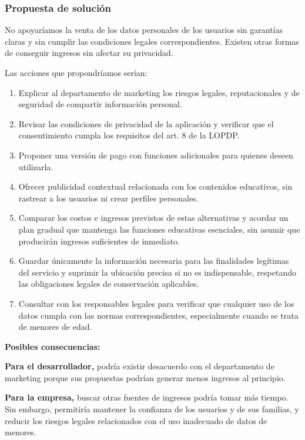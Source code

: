 \documentclass[12pt,a4paper,oneside]{article}
\newcommand{\rotulo}[1]{\par\Needspace{5\baselineskip}\noindent\textbf{#1}\par\nobreak}
\begin{document}
\subsubsection{Propuesta de solución}

No apoyaríamos la venta de los datos personales de los usuarios sin garantías claras y sin cumplir las condiciones legales correspondientes. Existen otras formas de conseguir ingresos sin afectar su privacidad.

Las acciones que propondríamos serían:

\begin{enumerate}[leftmargin=1.8em,itemsep=3pt]
    \item Explicar al departamento de marketing los riesgos legales, reputacionales y de seguridad de compartir información personal.
    \item Revisar las condiciones de privacidad de la aplicación y verificar que el consentimiento cumpla los requisitos del art. 8 de la LOPDP.
    \item Proponer una versión de pago con funciones adicionales para quienes deseen utilizarla.
    \item Ofrecer publicidad contextual relacionada con los contenidos educativos, sin rastrear a los usuarios ni crear perfiles personales.
    \item Comparar los costos e ingresos previstos de estas alternativas y acordar un plan gradual que mantenga las funciones educativas esenciales, sin asumir que producirán ingresos suficientes de inmediato.
    \item Guardar únicamente la información necesaria para las finalidades legítimas del servicio y suprimir la ubicación precisa si no es indispensable, respetando las obligaciones legales de conservación aplicables.
    \item Consultar con los responsables legales para verificar que cualquier uso de los datos cumpla con las normas correspondientes, especialmente cuando se trata de menores de edad.
\end{enumerate}

\rotulo{Posibles consecuencias:}

\textbf{Para el desarrollador,} podría existir desacuerdo con el departamento de marketing porque sus propuestas podrían generar menos ingresos al principio.

\textbf{Para la empresa,} buscar otras fuentes de ingresos podría tomar más tiempo. Sin embargo, permitiría mantener la confianza de los usuarios y de sus familias, y reducir los riesgos legales relacionados con el uso inadecuado de datos de menores.
\end{document}
